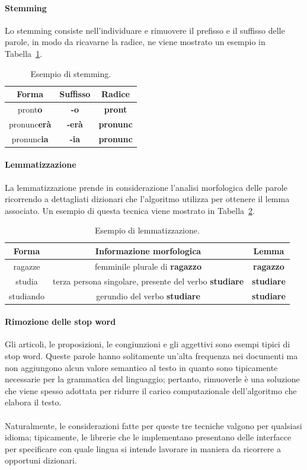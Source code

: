 \documentclass[12pt]{report}
\theoremstyle{definition}
\begin{document}
\paragraph{Stemming} Lo stemming consiste nell'individuare e rimuovere il prefisso e il suffisso delle parole, in modo da ricavarne la radice, ne viene mostrato un esempio in Tabella~\ref{stemming}.
\begin{table}
\centering
 \begin{tabular}{|c|c|c|} 
 \hline 
 \textbf{Forma} & \textbf{Suffisso} & \textbf{Radice}
\\ [0.5ex] 
\hline
pront\textbf{o} & \textbf{-o} & \textbf{pront} \\
pronunc\textbf{erà} & \textbf{-erà} & \textbf{pronunc} \\
pronunc\textbf{ia} & \textbf{-ia} & \textbf{pronunc} \\
 \hline
\end{tabular}
\caption{Esempio di stemming.}
\label{stemming}
\end{table}

\paragraph{Lemmatizzazione} La lemmatizzazione prende in considerazione l'analisi morfologica delle parole ricorrendo a dettagliati dizionari che l'algoritmo utilizza per ottenere il lemma associato.
Un esempio di questa tecnica viene mostrato in Tabella~\ref{lemmatization}.
\begin{table}
\centering
 \begin{tabular}{|c|c|c|} 
 \hline 
 \textbf{Forma} & \textbf{Informazione morfologica} & \textbf{Lemma}
\\ [0.5ex] 
\hline
ragazze & femminile plurale di \textbf{ragazzo} & \textbf{ragazzo} \\
studia & terza persona singolare, presente del verbo \textbf{studiare} & \textbf{studiare} \\
studiando & gerundio del verbo \textbf{studiare} & \textbf{studiare} \\
 \hline
\end{tabular}
\caption{Esempio di lemmatizzazione.}
\label{lemmatization}
\end{table}

\paragraph{Rimozione delle stop word}
Gli articoli, le proposizioni, le congiunzioni e gli aggettivi sono esempi tipici di stop word. Queste parole hanno solitamente un'alta frequenza nei documenti ma non aggiungono alcun valore semantico al testo in quanto sono tipicamente necessarie per la grammatica del linguaggio; pertanto, rimuoverle è una soluzione che viene spesso adottata per ridurre il carico computazionale dell'algoritmo che elabora il testo.
\\
\\
Naturalmente, le considerazioni fatte per queste tre tecniche valgono per qualsiasi idioma; tipicamente, le librerie che le implementano presentano delle interfacce per specificare con quale lingua si intende lavorare in maniera da ricorrere a opportuni dizionari.
\end{document}
